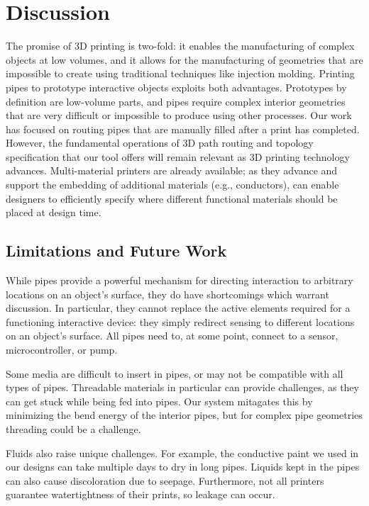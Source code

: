 \section{Discussion}

The promise of 3D printing is two-fold: it enables the manufacturing of complex objects at low volumes, and it allows for the manufacturing of geometries that are impossible to create using traditional techniques like injection molding.  Printing pipes to prototype interactive objects exploits both advantages. Prototypes by definition are low-volume parts, and pipes require complex interior geometries that are very difficult or impossible to produce using other processes. Our work has focused on routing pipes that are manually filled after a print has completed. However, the fundamental operations of 3D path routing and topology specification that our tool offers will remain relevant as 3D printing technology advances. Multi-material printers are already available; as they advance and support the embedding of additional materials (e.g., conductors), \systemname can enable designers to efficiently specify where different functional materials should be placed at design time.

\subsection{Limitations and Future Work}
While pipes provide a powerful mechanism for directing interaction to arbitrary locations on an object's surface, they do have shortcomings which warrant discussion.  In particular, they cannot replace the active elements required for a functioning interactive device: they simply redirect sensing to different locations on an object's surface.  All pipes need to, at some point, connect to a sensor, microcontroller, or pump. 

Some media are difficult to insert in pipes, or may not be compatible with all types of pipes.  Threadable materials in particular can provide challenges, as they can get stuck while being fed into pipes. Our system mitagates this by minimizing the bend energy of the interior pipes, but for complex pipe geometries threading could be a challenge. 

Fluids also raise unique challenges.  For example, the conductive paint we used in our designs can take multiple days to dry in long pipes. Liquids kept in the pipes can also cause discoloration due to seepage.  Furthermore, not all printers guarantee watertightness of their prints, so leakage can occur.

